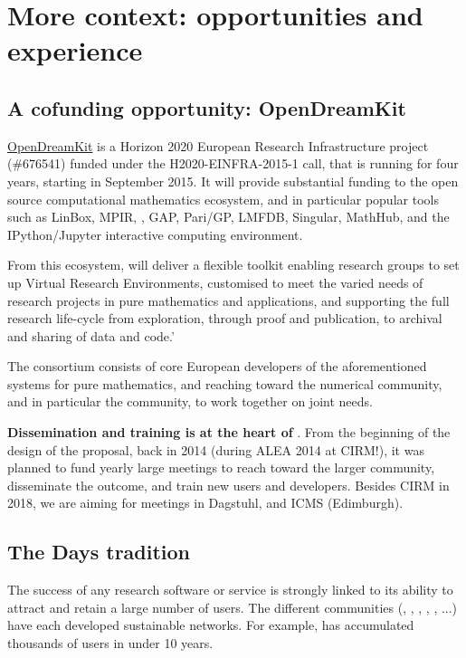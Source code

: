 \documentclass[12pt]{amsart}
\begin{document}
\section{More context: opportunities and experience}

\subsection{A cofunding opportunity: OpenDreamKit}

\href{http://opendreamkit.org}{OpenDreamKit} is a Horizon 2020
European Research Infrastructure project (\#676541) funded under the
H2020-EINFRA-2015-1 call, that is running for four years, starting in
September 2015. It will provide substantial funding to the open source
computational mathematics ecosystem, and in particular popular tools
such as LinBox, MPIR, \Sage, GAP, Pari/GP, LMFDB, Singular,
MathHub, and the IPython/Jupyter interactive computing environment.

From this ecosystem, \ODK will deliver a flexible toolkit enabling
research groups to set up Virtual Research Environments, customised to
meet the varied needs of research projects in pure mathematics and
applications, and supporting the full research life-cycle from
exploration, through proof and publication, to archival and sharing of
data and code.'

The \ODK  consortium consists of core European developers of the
aforementioned systems for pure mathematics, and reaching toward the
numerical community, and in particular the \Jupyter  community, to work
together on joint needs.

\textbf{Dissemination and training is at the heart of \ODK}. From the
beginning of the design of the proposal, back in 2014 (during ALEA
2014 at CIRM!), it was planned to fund yearly large meetings to reach
toward the larger community, disseminate the outcome, and train new
users and developers. Besides CIRM in 2018, we are aiming for meetings
in Dagstuhl, and ICMS (Edimburgh).


\subsection{The \Sage Days tradition}

The success of any research software or service is strongly linked to
its ability to attract and retain a large number of users. The
different communities (\Sage, \GAP, \Pari, \Singular, \Jupyter, ...)
have each developed sustainable networks. For example, \Sage has
accumulated thousands of users in under 10 years.
\end{document}
